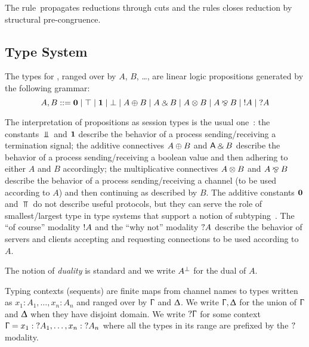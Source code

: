 The rule~\RCut propagates reductions through cuts and the rules \RCong closes
reduction by structural pre-congruence.

\subsection{Type System}
\label{sec:typing-rules}

The types for \Calculus, ranged over by $A$, $B$, \dots, are linear logic
 propositions generated by the following grammar:
\[
    A, B ::= \Zero \mid \Top \mid \One \mid \Bot \mid A \Plus B \mid A \With B \mid A \Ten B \mid A \Par B \mid \OfCourse A \mid \WhyNot A
\]

The interpretation of propositions as session types is the usual
one~\cite{Wadler14}: the constants $\Bot$ and $\mathbf{1}$ describe the behavior of a
process sending/receiving a termination signal; the additive connectives $A
\mathbin\oplus B$ and $\mathsf{A} \mathbin\binampersand B$ describe the behavior of a process sending/receiving a
boolean value and then adhering to either $A$ and $B$ accordingly; the
multiplicative connectives $A \mathbin\otimes B$ and $A \mathbin\bindnasrepma B$ describe the behavior of a
process sending/receiving a channel (to be used according to $A$) and then
continuing as described by $B$. The additive constants $\mathbf{0}$ and $\Top$ do not
describe useful protocols, but they can serve the role of smallest/largest type
in type systems that support a notion of subtyping~\citep{HornePadovani24}. The
``of course'' modality $\OfCourse A$ and the ``why not'' modality $\WhyNot A$
describe the behavior of servers and clients accepting and requesting
connections to be used according to $A$.

The notion of \emph{duality} is standard and we write $A^{\bot}$ for the dual of
$A$.

Typing contexts (\ie sequents) are finite maps from channel names to types
written as $x_1 : A_1, \dots, x_n : A_n$ and ranged over by $\Upgamma$ and
$\Updelta$. We write $\Upgamma, \Updelta$ for the union of $\Upgamma$ and
$\Updelta$ when they have disjoint domain. We write $\WhyNot\Context$ for some
context $\Context = x_1 : \WhyNot A_1, \dots, x_n : \WhyNot A_n$ where all the
types in its range are prefixed by the $\WhyNot$ modality.


